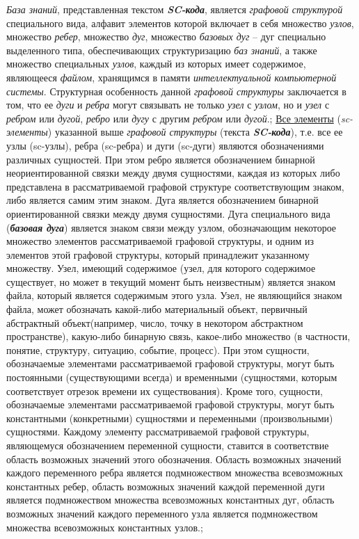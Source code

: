 \begin{SCn}
{\textit{База знаний}, представленная текстом \textit{\textbf{SC-кода}}, является \textit{графовой структурой} специального вида, алфавит элементов которой включает в себя множество \textit{узлов}, множество \textit{ребер}, множество \textit{дуг}, множество \textit{базовых дуг} -- дуг специально выделенного типа, обеспечивающих структуризацию \textit{баз знаний}, а также множество специальных \textit{узлов}, каждый из которых имеет содержимое, являющееся \textit{файлом}, хранящимся в памяти \textit{интеллектуальной компьютерной системы}. Структурная особенность данной \textit{графовой структуры} заключается в том, что ее \textit{дуги} и \textit{ребра} могут связывать не только \textit{узел} с \textit{узлом}, но и \textit{узел} с \textit{ребром} или \textit{дугой}, \textit{ребро} или \textit{дугу} с другим \textit{ребром} или \textit{дугой}.;
\uline{Все элементы} (\textit{sc-элементы}) указанной выше \textit{графовой структуры} (текста \textit{\textbf{SC-кода}}), т.е. все ее узлы (sc-узлы), ребра (sc-ребра) и дуги (sc-дуги) являются обозначениями различных сущностей. При этом ребро является обозначением бинарной неориентированной связки между двумя сущностями, каждая из которых либо представлена в рассматриваемой графовой структуре соответствующим знаком, либо является самим этим знаком. Дуга является обозначением бинарной ориентированной связки между двумя сущностями. Дуга специального вида (\textit{\textbf{базовая дуга}}) является знаком связи между узлом, обозначающим некоторое множество элементов рассматриваемой графовой структуры, и одним из элементов этой графовой структуры, который принадлежит указанному множеству. Узел, имеющий содержимое (узел, для которого содержимое существует, но может в текущий момент быть неизвестным) является знаком файла, который является содержимым этого узла. Узел, не являющийся знаком файла, может обозначать какой-либо материальный объект, первичный абстрактный объект(например, число, точку в некотором абстрактном пространстве), какую-либо бинарную связь, какое-либо множество (в частности, понятие, структуру, ситуацию, событие, процесс). При этом сущности, обозначаемые элементами рассматриваемой графовой структуры, могут быть постоянными (существующими всегда) и временными (сущностями, которым соответствует отрезок времени их существования). Кроме того, сущности, обозначаемые элементами рассматриваемой графовой структуры, могут быть константными (конкретными) сущностями и переменными (произвольными) сущностями. Каждому элементу рассматриваемой графовой структуры, являющемуся обозначением переменной сущности, ставится в соответствие область возможных значений этого обозначения. Область возможных значений каждого переменного ребра является подмножеством множества всевозможных константных ребер, область возможных значений каждой переменной дуги является подмножеством множества всевозможных константных дуг, область возможных значений каждого переменного узла является подмножеством множества всевозможных константных узлов.;
}
\end{SCn}
